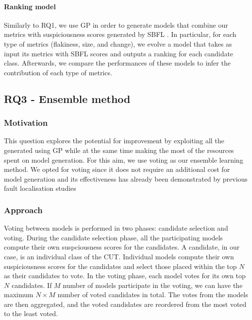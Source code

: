 \paragraph{Ranking model}
Similarly to RQ1, we use GP in order to generate models that combine our metrics with suspiciousness scores generated by SBFL \formulas.
In particular, for each type of metrics (\ie flakiness, size, and change), we evolve a model that takes as input its metrics with SBFL scores and outputs a ranking for each candidate class.
Afterwards, we compare the performances of these models to infer the contribution of each type of metrics.



\subsection{RQ3 - Ensemble method}\label{sec:rq3_ensemble_method}
\subsubsection{Motivation}
This question explores the potential for improvement by exploiting all the \formulas generated using GP while at the same time making the most of the resources spent on model generation.
For this aim, we use voting as our ensemble learning method.
We opted for voting since it does not require an additional cost for model generation and its effectiveness has already been demonstrated by previous fault localisation studies~\cite{Sohn2021ea,Sohn2019aa}

\subsubsection{Approach}
Voting between models is performed in two phases: candidate selection and voting. During the candidate selection phase, all the participating models compute their own suspciousness scores for the candidates. A candidate, in our case, is an individual class of the CUT. %
Individual models compute their own suspiciousness scores for the candidates and select those placed within the top $N$ as their candidates to vote.
In the voting phase, each model votes for its own top $N$ candidates. If $M$ number of models participate in the voting, we can have the maximum $N \times M$ number of voted candidates in total. The votes from the models are then aggregated, and the voted candidates are reordered from the most voted to the least voted. 


